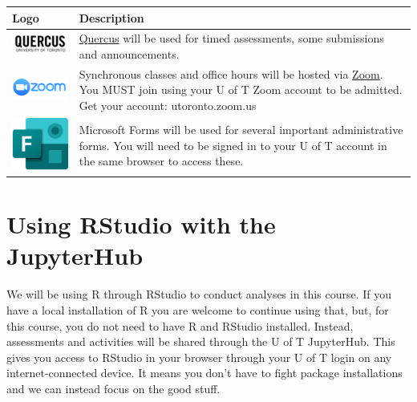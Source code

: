 \documentclass[
  openany]{book}
\begin{document}
\begin{longtable}[]{@{}
  >{\centering\arraybackslash}p{}
  >{\centering\arraybackslash}p{}@{}}
\toprule
Logo & Description \\
\midrule
\endhead
\includegraphics{images/course-tools/quercus.jpg} & \href{https://q.utoronto.ca/}{Quercus}
will be used for timed
assessments, some submissions
and announcements. \\
\includegraphics{images/course-tools/zoom.png} & Synchronous classes and office
hours will be hosted via
\href{https://utoronto.zoom.us}{Zoom}.
You MUST join using your U of
T Zoom account to be admitted.
Get your account:
utoronto.zoom.us \\
\includegraphics{images/course-tools/forms.png} & Microsoft Forms will be used
for several important
administrative forms. You will
need to be signed in to your U
of T account in the same
browser to access these. \\
\bottomrule
\end{longtable}

\hypertarget{using-rstudio-with-the-jupyterhub}{%
\section{Using RStudio with the JupyterHub}\label{using-rstudio-with-the-jupyterhub}}

We will be using R through RStudio to conduct analyses in this course. If you have a local installation of R you are welcome to continue using that, but, for this course, you do not need to have R and RStudio installed. Instead, assessments and activities will be shared through the U of T JupyterHub. This gives you access to RStudio in your browser through your U of T login on any internet-connected device. It means you don't have to fight package installations and we can instead focus on the good stuff.
\end{document}
